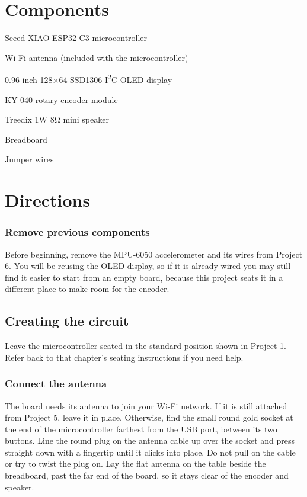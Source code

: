 \pagebreak

\section{Components}
\begin{components}
    \item Seeed XIAO ESP32-C3 microcontroller
    \item Wi-Fi antenna (included with the microcontroller)
    \item 0.96-inch 128$\times$64 SSD1306 I\textsuperscript{2}C OLED display
    \item KY-040 rotary encoder module
    \item Treedix 1W 8\si{\ohm} mini speaker
    \item Breadboard
    \item Jumper wires
\end{components}

\section{Directions}

\subsubsection{Remove previous components}
Before beginning, remove the MPU-6050 accelerometer and its wires from Project 6. You will be reusing the OLED display, so if it is
already wired you may still find it easier to start from an empty board, because this project
seats it in a different place to make room for the encoder.

\subsection{Creating the circuit}

Leave the microcontroller seated in the standard position shown in Project 1. Refer back to
that chapter's seating instructions if you need help.

\subsubsection{Connect the antenna}
The board needs its antenna to join your Wi-Fi network. If it is still attached from Project 5,
leave it in place. Otherwise, find the small round gold socket at the end of the microcontroller
farthest from the USB port, between its two buttons. Line the round plug on the antenna cable up over
the socket and press straight down with a fingertip until it clicks into place. Do not pull on the
cable or try to twist the plug on. Lay the flat antenna on the table beside the breadboard, past the
far end of the board, so it stays clear of the encoder and speaker.

